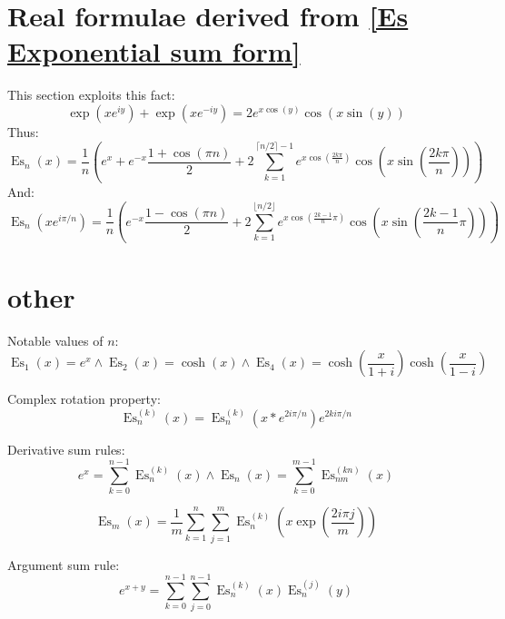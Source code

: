\documentclass[]{article}
\DeclareMathOperator{\es}{Es}
\newcommand{\pqty}[1]{{\left(#1\right)}}
\begin{document}
	
	\section{Real formulae derived from \eqref{Es Exponential sum form}}
	This section exploits this fact:
	\begin{equation}
	\exp\pqty{xe^{iy}}+\exp\pqty{xe^{-iy}}
	=
	2e^{x\cos\pqty{y}} \cos\pqty{x\sin\pqty{y}}
	\end{equation}
	Thus:
	\begin{equation}
	\label{Es trig sum form 1}
	\es_n\pqty{x}
	=
	\frac{1}{n}\pqty{
		e^x+e^{-x}\frac{1+\cos\pqty{\pi n}}{2} 
		+2\sum _{k=1}^{\lceil n/2\rceil-1}e^{x\cos\pqty{\frac{2k\pi}{n}}} \cos\pqty{x\sin\pqty{\frac{2k\pi}{n}}}
	}
	\end{equation}
	And:
	\begin{equation}
	\es_n\pqty{xe^{i\pi/n}}
	=
	\frac{1}{n}\pqty{
		e^{-x}\frac{1-\cos\pqty{\pi n}}{2}
		+2\sum _{k=1}^{\lfloor n/2\rfloor}e^{x\cos\pqty{\frac{2k-1}{n}\pi}} \cos\pqty{x\sin\pqty{\frac{2k-1}{n}\pi}}
	}
	\end{equation}
	
	
	
	\section{other}
	Notable values of \(n\):
	\begin{equation}
	\es_1\pqty{x}=e^x\land\es_2\pqty{x}=\cosh\pqty{x}\land\es_4\pqty{x}=\cosh\pqty{\frac{x}{1+i}}\cosh\pqty{\frac{x}{1-i}}
	\end{equation}
	
	Complex rotation property:
	\begin{equation}
	\es_n^{(k)}\pqty{x}=
	\es_n^{(k)}\pqty{x*e^{2i\pi/n}}e^{2ki\pi/n}
	\end{equation}
	
	Derivative sum rules:
	\begin{equation}
	e^x=\sum_{k=0}^{n-1}\es_n^{(k)}\pqty{x}\land\es_n\pqty{x}=\sum_{k=0}^{m-1}\es_{nm}^{(kn)}\pqty{x}
	\end{equation}
	
	\begin{equation}
	\es_m\pqty{x}=
	\frac{1}{m}
	\sum_{k=1}^{n}\sum_{j=1}^{m}\es_n^{(k)}\pqty{x\exp\pqty{\frac{2 i \pi j}{m}}}
	\end{equation}
	
	Argument sum rule:
	\begin{equation}
	e^{x+y}=\sum_{k=0}^{n-1}\sum_{j=0}^{n-1}\es_n^{(k)}\pqty{x}\es_n^{(j)}\pqty{y}
	\end{equation}
	
\end{document}
